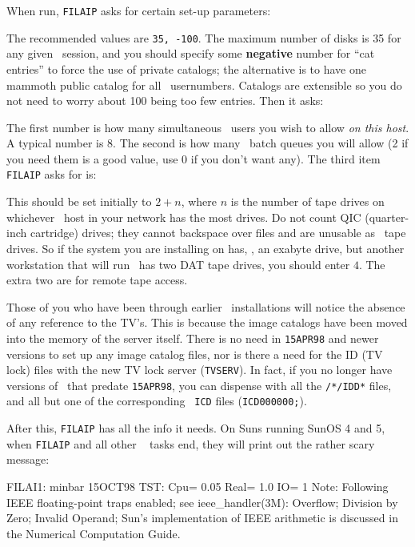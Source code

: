 When run, {\tt FILAIP} asks for certain set-up parameters:\medskip

\medskip

\noindent The recommended values are {\tt 35, -100}.  The maximum number
of disks is 35 for any given \AIPS\ session, and you should specify some
{\bf negative} number for ``cat entries'' to force the use of private
catalogs; the alternative is to have one mammoth public catalog for all
\AIPS\ usernumbers.  Catalogs are extensible so you do not need to worry
about 100 being too few entries.  Then it asks:\medskip

\medskip

\noindent The first number is how many simultaneous \AIPS\ users you
wish to allow {\it on this host\/}.  A typical number is 8.  The second
is how many \AIPS\ batch queues you will allow (2 if you need them is a
good value, use 0 if you don't want any).  The third item {\tt FILAIP}
asks for is:\medskip

\medskip

\noindent This should be set initially to $2+n$, where $n$ is the number
of tape drives on whichever \AIPS\ host in your network has the most
drives.  Do not count QIC (quarter-inch cartridge) drives; they cannot
backspace over files and are unusable as \AIPS\ tape drives.  So if the
system you are installing on has, \eg, an exabyte drive, but another
workstation that will run \AIPS\ has two DAT tape drives, you should
enter $4$.  The extra two are for remote tape access.

Those of you who have been through earlier \AIPS\ installations will
notice the absence of any reference to the TV's.  This is because the
image catalogs have been moved into the memory of the server itself.
There is no need in {\tt 15APR98} and newer versions to set up any image
catalog files, nor is there a need for the ID (TV lock) files with the
new TV lock server ({\tt TVSERV}).  In fact, if you no longer have
versions of \AIPS\ that predate {\tt 15APR98}, you can dispense with all
the {\tt{}/*/IDD*} files, and all but one of the corresponding {\tt
ICD} files ({\tt ICD000000;}).

After this, {\tt FILAIP} has all the info it needs.  On Suns running
SunOS 4 and 5, when {\tt FILAIP} and all other \AIPS~ tasks end, they
will print out the rather scary message:\medskip

\fortran
FILAI1: minbar 15OCT98 TST: Cpu=    0.05  Real=     1.0  IO=         1
 Note: Following IEEE floating-point traps enabled; see ieee_handler(3M):
 Overflow;  Division by Zero;  Invalid Operand;
 Sun's implementation of IEEE arithmetic is discussed in
 the Numerical Computation Guide.
\endfortran
\medskip


